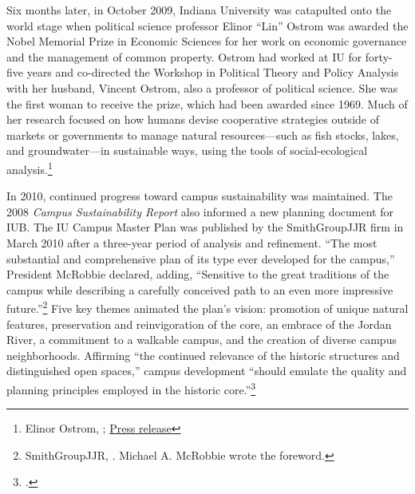 \documentclass[
  american,
  letterpaper,
]{scrreprt}
\begin{document}
Six months later, in October 2009, Indiana University was catapulted
onto the world stage when political science professor Elinor ``Lin''
Ostrom was awarded the Nobel Memorial Prize in Economic Sciences for her
work on economic governance and the management of common property.
Ostrom had worked at IU for forty-five years and co-directed the
Workshop in Political Theory and Policy Analysis with her husband,
Vincent Ostrom, also a professor of political science. She was the first
woman to receive the prize, which had been awarded since 1969. Much of
her research focused on how humans devise cooperative strategies outside
of markets or governments to manage natural resources---such as fish
stocks, lakes, and groundwater---in sustainable ways, using the tools of
social-ecological analysis.\footnote{Elinor Ostrom,
  ;
  \href{https://www.nobelprize.org/prizes/economic-sciences/2009/press-release/.}{Press
  release}}

In 2010, continued progress toward campus sustainability was maintained.
The 2008 \emph{Campus Sustainability Report} also informed a new
planning document for IUB. The IU Campus Master Plan was published by
the SmithGroupJJR firm in March 2010 after a three-year period of
analysis and refinement. ``The most substantial and comprehensive plan
of its type ever developed for the campus,'' President McRobbie
declared, adding, ``Sensitive to the great traditions of the campus
while describing a carefully conceived path to an even more impressive
future.''\footnote{SmithGroupJJR,
  . Michael A. McRobbie wrote the
  foreword.} Five key themes animated the plan's vision: promotion of
unique natural features, preservation and reinvigoration of the core, an
embrace of the Jordan River, a commitment to a walkable campus, and the
creation of diverse campus neighborhoods. Affirming ``the continued
relevance of the historic structures and distinguished open spaces,''
campus development ``should emulate the quality and planning principles
employed in the historic core.''\footnote{.}
\end{document}

